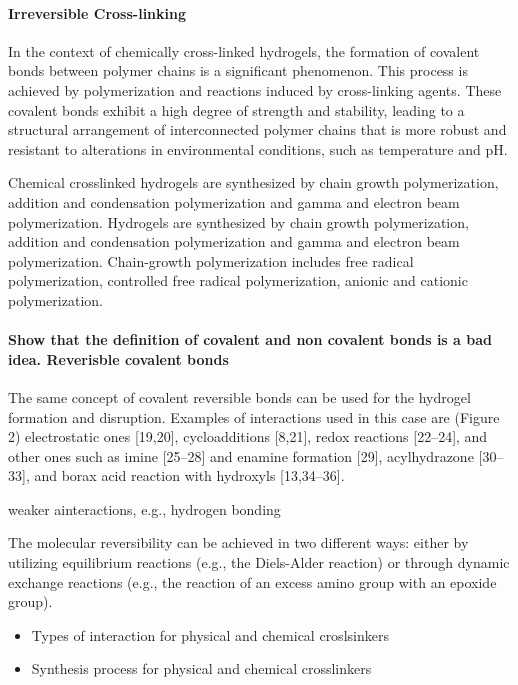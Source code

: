 \paragraph{Irreversible Cross-linking}
In the context of chemically cross-linked hydrogels, the formation of covalent bonds between polymer chains is a significant phenomenon.
This process is achieved by polymerization and reactions induced by cross-linking agents.
These covalent bonds exhibit a high degree of strength and stability, leading to a structural arrangement of interconnected polymer chains that is more robust and resistant to alterations in environmental conditions, such as temperature and pH.

\citep{maitraCrosslinkingHydrogelsReview2014}
Chemical crosslinked hydrogels are synthesized by chain growth polymerization, addition and condensation polymerization and gamma and electron beam polymerization.
Hydrogels are synthesized by chain growth polymerization, addition and condensation polymerization and gamma and electron beam polymerization.
Chain-growth polymerization includes free radical polymerization, controlled free radical polymerization, anionic and cationic polymerization.



\paragraph{Show that the definition of covalent and non covalent bonds is a bad idea. Reverisble covalent bonds}
\citep{picchioniHydrogelsBasedDynamic2018}
The same concept of covalent reversible bonds can be used for the hydrogel formation and disruption. 
Examples of interactions used in this case are (Figure 2) electrostatic ones [19,20], cycloadditions [8,21], redox reactions [22–24], and other ones such as imine [25–28] and enamine formation [29], acylhydrazone [30–33], and borax acid reaction with hydroxyls [13,34–36].

weaker ainteractions, e.g., hydrogen bonding\citep{picchioniHydrogelsBasedDynamic2018}


The molecular reversibility can be achieved in two different ways: either by utilizing equilibrium reactions (e.g., the Diels-Alder reaction) or through dynamic exchange reactions (e.g., the reaction of an excess amino group with an epoxide group)\citep{picchioniHydrogelsBasedDynamic2018}.




\begin{itemize}
    \item Types of interaction for physical and chemical croslsinkers
    \item Synthesis process for physical and chemical crosslinkers
\end{itemize}


